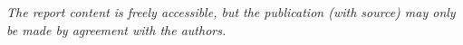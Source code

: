 \vfill

{\footnotesize\itshape The report content is freely accessible, but the publication (with source) may only be made by agreement with the authors.}

